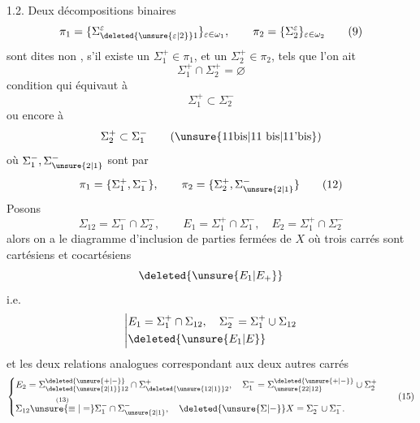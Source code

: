 1.2. Deux décompositions binaires
\[
\pi_1=\{\Sigma_{\deleted{\unsure{\varepsilon|2}}1}^\varepsilon\}_{\varepsilon\in\omega_1},\qquad\pi_2=\{\Sigma_2^\varepsilon\}_{\varepsilon\in\omega_2}\tag*{(9)}
\]
sont dites non \uline{},  s'il existe un  $\Sigma_1^+\in\pi_1$, et un $\Sigma_2^+\in\pi_2$, tels que l'on ait
\[
\Sigma_1^+\cap\Sigma_2^+=\varnothing\tag*{(10)}
\]
condition qui équivaut à
\[
\Sigma_1^+\subset\Sigma_2^-\tag*{(11)}
\]
ou encore à
\[
\Sigma_2^+\subset\Sigma_1^-\tag*{(\unsure{11bis|11 bis|11'bis})}
\]
où $\Sigma_1^-,\Sigma_{\unsure{2|1}}^-$ sont  par
\[
\pi_1=\{\Sigma_1^+,\Sigma_1^-\},\qquad\pi_2=\{\Sigma_2^+,\Sigma_{\unsure{2|1}}^-\}\tag*{(12)}
\]
\endgroup
{}
\begingroup
\makeatletter\tagsleft@true\makeatother
Posons
\[
\Sigma_{12}=\Sigma_1^-\cap\Sigma_2^-,\qquad E_1=\Sigma_1^+\cap\Sigma_1^-,\quad E_2=\Sigma_1^+\cap\Sigma_2^-\tag*{(13)}
\]
alors on a le diagramme d'inclusion de parties fermées de $X$
\usetikzlibrary{decorations.pathmorphing}
où  trois carrés sont cartésiens et cocartésiens
\[
\deleted{\unsure{E_1|E_+}}
\]
i.e.
\[
\left|\begin{aligned}
&E_1=\Sigma_1^+\cap\Sigma_{12},\quad\Sigma_2^-=\Sigma_1^+\cup\Sigma_{12}\\
&\deleted{\unsure{E_1|E}}
\end{aligned}\right.
\]
et les deux relations analogues correspondant aux deux autres carrés
\[
\left\{\begin{aligned}
&E_2=\Sigma_{\deleted{\unsure{2|1}}12}^{\deleted{\unsure{+|-}}}\cap\Sigma_{\deleted{\unsure{12|1}}2}^+,\quad \Sigma_1^-=\Sigma_{\unsure{22|12}}^{\deleted{\unsure{+|-}}}\cup\Sigma_2^+\\
&\Sigma_{12}\overset{(13)}{\unsure{\equiv|=}}\Sigma_1^-\cap\Sigma_{\unsure{2|1}}^-,\quad \deleted{\unsure{\Sigma|{-}}}X=\Sigma_2^-\cup\Sigma_1^-.
\end{aligned}\right.\tag*{(15)}
\]

